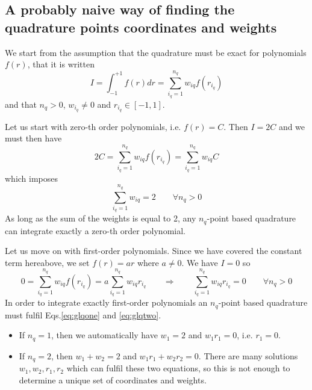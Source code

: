 \subsection{A probably naive way of finding the quadrature points coordinates and weights}

We start from the assumption that the quadrature must be exact for polynomials $f(r)$, that it is 
written
\[
I= \int_{-1}^{+1} f(r) dr = \sum_{i_q=1}^{n_q} w_{iq} f(r_{i_q}) 
\]
and that $n_q>0$, $w_{i_q}\neq 0$ and $r_{i_q}\in [-1,1]$.

Let us start with zero-th order polynomials, i.e. $f(r)=C$. Then $I=2C$ and we must then 
have 
\[
2C = \sum_{i_q=1}^{n_q} w_{iq} f(r_{i_q})  =  \sum_{i_q=1}^{n_q} w_{iq} C   
\]
which imposes 
\begin{equation}
\boxed{
\sum_{i_q=1}^{n_q} w_{iq} = 2 \qquad \forall n_q>0
}
\label{eq:glqone}
\end{equation}
As long as the sum of the weights is equal to 2, any $n_q$-point based quadrature can 
integrate exactly a zero-th order polynomial. 

Let us move on with first-order polynomials. Since we have covered the constant term hereabove, we
set $f(r)=ar$ where $a\neq 0$. We have $I=0$ so
\begin{equation}
0 = \sum_{i_q=1}^{n_q} w_{iq} f(r_{i_q})  = a \sum_{i_q=1}^{n_q} w_{iq} r_{i_q}
\qquad
\Rightarrow
\qquad
\boxed{
\sum_{i_q=1}^{n_q} w_{iq} r_{i_q} = 0\qquad \forall n_q>0
}
 \label{eq:glqtwo}
\end{equation}
In order to integrate exactly first-order polynomials an $n_q$-point based quadrature must 
fulfil Eqs.\eqref{eq:glqone} and \eqref{eq:glqtwo}.
\begin{itemize}
\item
If $n_q=1$, then we automatically have $w_1=2$ and $w_1 r_1 =0 $, i.e. $r_1=0$.
\item
If $n_q=2$, then $w_1+w_2=2$ and $w_1r_1+w_2r_2 = 0$. There are many solutions $w_1,w_2,r_1,r_2$ which 
can fulfil these two equations, so this is not enough to determine a unique set of coordinates and weights.
\end{itemize}

